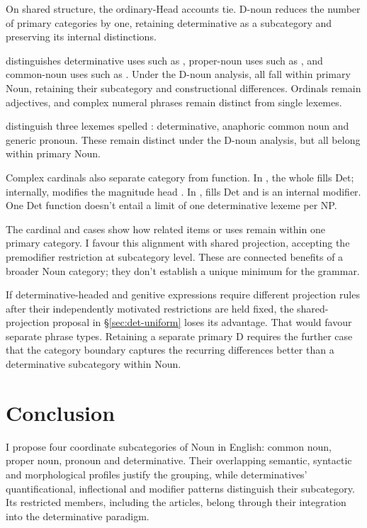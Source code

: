 \documentclass[12pt]{article}
\begin{document}
On shared structure, the ordinary-Head accounts tie. D-noun reduces the number of primary categories by one, retaining determinative as a subcategory and preserving its internal distinctions.

\textcite{reynolds2026numerals} distinguishes determinative uses such as , proper-noun uses such as , and common-noun uses such as . Under the D-noun analysis, all fall within primary Noun, retaining their subcategory and constructional differences. Ordinals remain adjectives, and complex numeral phrases remain distinct from single lexemes.

\textcite[797--798]{payne2013anaphoric} distinguish three lexemes spelled : determinative, anaphoric common noun and generic pronoun. These remain distinct under the D-noun analysis, but all belong within primary Noun.

Complex cardinals also separate category from function. In , the whole  fills Det; internally,  modifies the magnitude head  \citep[§4]{reynolds2026numerals}. In ,  fills Det and  is an internal modifier. One Det function doesn't entail a limit of one determinative lexeme per NP.

The cardinal and  cases show how related items or uses remain within one primary category. I favour this alignment with shared projection, accepting the premodifier restriction at subcategory level. These are connected benefits of a broader Noun category; they don't establish a unique minimum for the grammar.

If determinative-headed and genitive expressions require different projection rules after their independently motivated restrictions are held fixed, the shared-projection proposal in §\ref{sec:det-uniform} loses its advantage. That would favour separate phrase types. Retaining a separate primary D requires the further case that the category boundary captures the recurring differences better than a determinative subcategory within Noun.

\section{Conclusion}\label{sec:conclusion}

I propose four coordinate subcategories of Noun in English: common noun, proper noun, pronoun and determinative. Their overlapping semantic, syntactic and morphological profiles justify the grouping, while determinatives' quantificational, inflectional and modifier patterns distinguish their subcategory. Its restricted members, including the articles, belong through their integration into the determinative paradigm.
\end{document}

